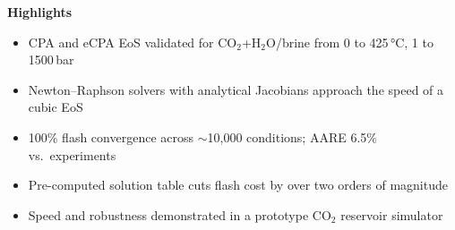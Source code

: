 \documentclass[11pt]{article}
\begin{document}
\noindent\textbf{Highlights}

\begin{itemize}[leftmargin=1.5em, itemsep=4pt]
  \item CPA and eCPA EoS validated for CO$_2$+H$_2$O/brine from 0 to 425\,°C, 1 to 1500\,bar
  \item Newton--Raphson solvers with analytical Jacobians approach the speed of a cubic EoS
  \item 100\% flash convergence across $\sim$10,000 conditions; AARE 6.5\% vs.\ experiments
  \item Pre-computed solution table cuts flash cost by over two orders of magnitude
  \item Speed and robustness demonstrated in a prototype CO$_2$ reservoir simulator
\end{itemize}
\end{document}
